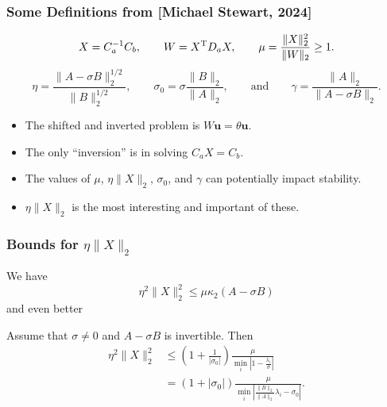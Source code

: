 \documentclass[landscape]{beamer}
\newcommand{\eqand}{\qquad\mbox{and}\qquad}
\renewcommand{\vec}[1]{\bm{#1}}
\newcommand{\T}{{\rm T}}
\begin{document}
\begin{frame}
  \frametitle{Some Definitions from [Michael Stewart, 2024]}

  \begin{equation*}
    X = C_a^{-1} C_b,  \qquad W = X^\T D_a X, \qquad
    \mu = \frac{\|X\|_2^2}{\|W\|_2} \geq 1.
  \end{equation*}
  \begin{equation*}
    \eta = \frac{\|A-\sigma B\|_2^{1/2}}{\|B\|_2^{1/2}},\qquad \sigma_0 = \sigma \frac{\|B\|_2}{\|A\|_2},
    \eqand \gamma = \frac{\|A\|_2}{\|A-\sigma B\|_2}.
  \end{equation*}
  
  \begin{itemize}
  \item The shifted and inverted problem is $W \vec{u} = \theta \vec{u}$.
  \item The only ``inversion'' is in solving $C_a X = C_b$.
  \item The values of $\mu$, $\eta \|X\|_2$, $\sigma_0$, and $\gamma$
    can potentially impact stability.
  \item $\eta \|X\|_2$ is the most interesting and important of these.
  \end{itemize}
\end{frame}

\begin{frame}
  \frametitle{Bounds for $\eta \|X\|_2$}

  We have
  \begin{equation*}
     \eta^2 \|X\|_2^2 \leq \mu \kappa_2(A-\sigma B)
  \end{equation*}
  and even better
  \begin{lemma}
    Assume that $\sigma \neq 0$ and $A-\sigma B$ is invertible.  Then
    \begin{align*}
      \eta^2 \|X\|_2^2 
      & \leq
      \left(1 + \frac{1}{|\sigma_0|}\right)
      \frac{\mu}{\min_i \left| 1 - \frac{\lambda_i}{\sigma}\right|} \\
      & = 
        (1 + |\sigma_0|)
        \frac{\mu}
        {\min_i \left|\frac{\|B\|_2}{\|A\|_2}\lambda_i - \sigma_0\right|}.
    \end{align*}
  \end{lemma}
\end{frame}
\end{document}
